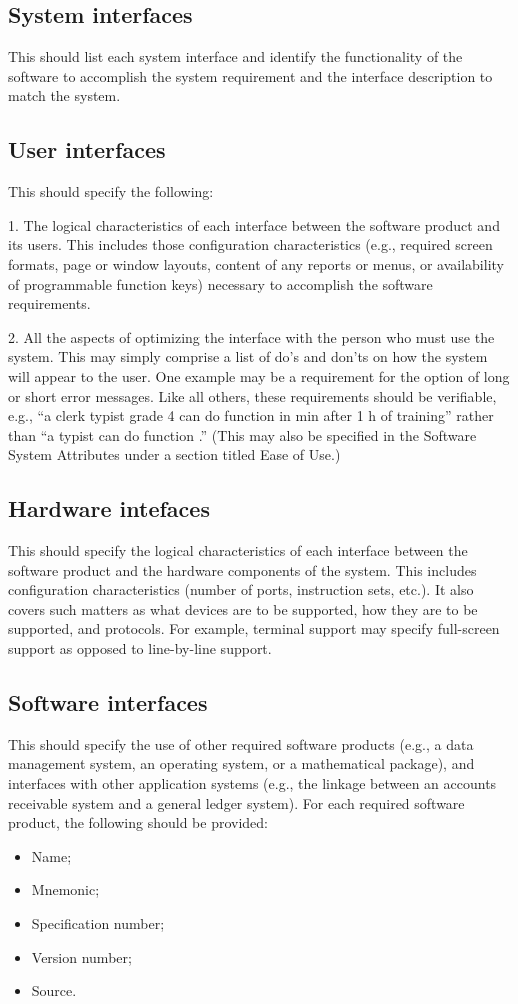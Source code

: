 \documentclass{scrreprt}
\begin{document}
\subsection{System interfaces}
This should list each system interface and identify the functionality of the
software to accomplish the system requirement and the interface description to
match the system.

\subsection{User interfaces}
This should specify the following:

1. The logical characteristics of each interface between the software product
and its users. This includes those configuration characteristics (e.g., required
screen formats, page or window layouts, content of any reports or menus, or
availability of programmable function keys) necessary to accomplish the software
requirements.\par

2. All the aspects of optimizing the interface with the person who must use the
system. This may simply comprise a list of do's and don'ts on how the system
will appear to the user. One example may be a requirement for the option of long
or short error messages. Like all others, these requirements should be
verifiable, e.g., “a clerk typist grade 4 can do function  in min after 1 h of
training” rather than “a typist can do function .” (This may also be
specified in the Software System Attributes under a section titled Ease of
Use.)

\subsection{Hardware intefaces}
This should specify the logical characteristics of each interface between the
software product and the hardware components of the system. This includes
configuration characteristics (number of ports, instruction sets, etc.). It also
covers such matters as what devices are to be supported, how they are to be
supported, and protocols. For example, terminal support may specify full-screen
support as opposed to line-by-line support.

\subsection{Software interfaces}
This should specify the use of other required software products (e.g., a data management system, an operating system, or a mathematical package), and interfaces with other application systems (e.g., the linkage between an accounts receivable system and a general ledger system). For each required software product, the following should be provided:
\begin{itemize}
	\item Name;
	\item Mnemonic;
	\item Specification number;
	\item Version number;
	\item Source.
\end{itemize}
\end{document}
